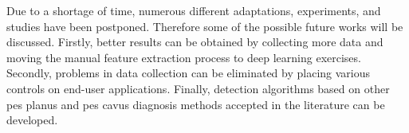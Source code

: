 Due to a shortage of time, numerous different adaptations, experiments, and studies have been postponed. Therefore some of the possible future works will be discussed. Firstly, better results can be obtained by collecting more data and moving the manual feature extraction process to deep learning exercises. Secondly, problems in data collection can be eliminated by placing various controls on end-user applications. Finally, detection algorithms based on other pes planus and pes cavus diagnosis methods accepted in the literature can be developed.

